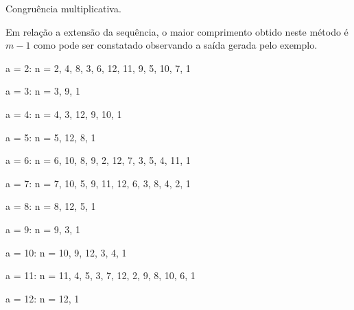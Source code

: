 \documentclass[a4paper,12pt,oneside,onecolumn]{uerj}
\begin{document}
\begin{algorithm}[!ht]
    \caption{Congruência multiplicativa.} \label{alg:congmult}
    \begin{pseudocode}
      \Documentacao
        \Algoritmo{}
                \Parar
              \Senao
              \FimSe
            \FimPara
          \FimPara
        \FimAlgoritmo
      \FimDocumentacao
    \end{pseudocode}
\end{algorithm}

Em relação a extensão da sequência, o maior comprimento obtido neste método é $m-1$ como pode ser constatado observando a saída gerada pelo exemplo.

\begin{lcircp}
    \item a =  2: n = {  2,  4,  8,  3,  6, 12, 11,  9,  5, 10,  7,  1 }
    \item a =  3: n = {  3,  9,  1 }
    \item a =  4: n = {  4,  3, 12,  9, 10,  1 }
    \item a =  5: n = {  5, 12,  8,  1 }
    \item a =  6: n = {  6, 10,  8,  9,  2, 12,  7,  3,  5,  4, 11,  1 }
    \item a =  7: n = {  7, 10,  5,  9, 11, 12,  6,  3,  8,  4,  2,  1 }
    \item a =  8: n = {  8, 12,  5,  1 }
    \item a =  9: n = {  9,  3,  1 }
    \item a = 10: n = { 10,  9, 12,  3,  4,  1 }
    \item a = 11: n = { 11,  4,  5,  3,  7, 12,  2,  9,  8, 10,  6,  1 }
    \item a = 12: n = { 12,  1 }\\
\end{lcircp}
\end{document}

